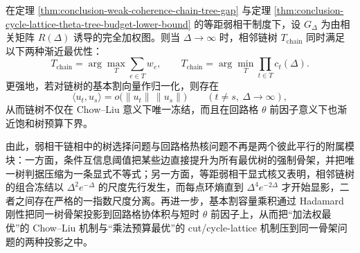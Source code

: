\begin{conjecture}[弱相干链相中的同一骨架双最优]\label{conj:conclusion-weak-coherence-chain-double-optimality}
在定理 \ref{thm:conclusion-weak-coherence-chain-tree-gap} 与定理 \ref{thm:conclusion-cycle-lattice-theta-tree-budget-lower-bound} 的等距弱相干制度下，设 \(G_\Delta\) 为由相关矩阵 \(R(\Delta)\) 诱导的完全加权图。则当 \(\Delta\to\infty\) 时，相邻链树 \(T_{\mathrm{chain}}\) 同时满足以下两种渐近最优性：
\[
T_{\mathrm{chain}}
=
\arg\max_T\sum_{e\in T}w_e,
\qquad
T_{\mathrm{chain}}
=
\arg\min_T\prod_{t\in T}c_t(\Delta).
\]
更强地，若对链树的基本割向量作归一化，则存在
\[
\langle u_t,u_s\rangle
=
o\!\bigl(\|u_t\|\,\|u_s\|\bigr)
\qquad
(t\neq s,\ \Delta\to\infty),
\]
从而链树不仅在 Chow--Liu 意义下唯一冻结，而且在回路格 \(\theta\) 前因子意义下也渐近饱和树预算下界。
\end{conjecture}

\noindent
由此，弱相干链相中的树选择问题与回路格热核问题不再是两个彼此平行的附属模块：一方面，条件互信息阈值把某些边直接提升为所有最优树的强制骨架，并把唯一树判据压缩为一条显式不等式；另一方面，等距弱相干显式核又表明，相邻链树的组合冻结以 \(\Delta^2e^{-\Delta}\) 的尺度先行发生，而每点环熵直到 \(\Delta^4e^{-2\Delta}\) 才开始显影，二者之间存在严格的一指数尺度分离。再进一步，基本割容量乘积通过 Hadamard 刚性把同一树骨架投影到回路格协体积与短时 \(\theta\) 前因子上，从而把“加法权最优”的 Chow--Liu 机制与“乘法预算最优”的 cut/cycle-lattice 机制压到同一骨架问题的两种投影之中。

\endinput
